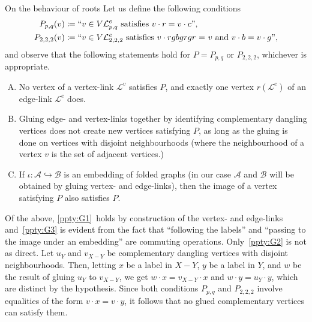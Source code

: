 \documentclass[10pt,a4paper]{amsart}
\theoremstyle{definition}
\newenvironment{enonce*}[1][]{\par\medskip\noindent}{\par\medskip}
\newcommand{\cA}{\mathcal{A}}
\newcommand{\cB}{\mathcal{B}}
\newcommand{\cL}{\mathcal{L}}
\begin{document}
\begin{enonce*}[remark]
{On the behaviour of roots} Let us define the following conditions
\begin{alignat*}{10}
P_{p,q}(v) &\coloneqq \text{$``v\in V\cL_{p,q}^e$ satisfies $v\cdot r = v\cdot c$''},\\
P_{2,2,2}(v) &\coloneqq \text{``$v\in V\cL_{2,2,2}^e$ satisfies $v\cdot rgbgrgr$ = $v$ and $v\cdot b = v\cdot g$''},
\end{alignat*}
and observe that the following statements hold for $P = P_{p,q}$ or $P_{2,2,2}$, whichever is appropriate.

\begin{enumerate}[G.\arabic{enumi}]
\item \label{ppty:G1} No vertex of a vertex-link $\cL^v$ satisfies $P$, and exactly one vertex $r(\cL^e)$ of an edge-link $\cL^e$ does.
\item \label{ppty:G2} Gluing edge- and vertex-links together by identifying complementary dangling vertices does not create new vertices satisfying $P$, as long as the gluing is done on vertices with disjoint neighbourhoods (where the neighbourhood of a vertex $v$ is the set of adjacent vertices.)
\item \label{ppty:G3} If $\iota:\cA \hookrightarrow \cB$ is an embedding of folded graphs (in our case $\cA$ and $\cB$ will be obtained by gluing vertex- and edge-links), then the image of a vertex satisfying $P$ also satisfies $P$. 
\end{enumerate}

Of the above, \ref{ppty:G1}~holds by construction of the vertex- and edge-links and~\ref{ppty:G3} is evident from the fact that ``following the labels'' and ``passing to the image under an embedding'' are commuting operations. Only~\ref{ppty:G2} is not as direct. Let $u_Y$ and $v_{X-Y}$ be complementary dangling vertices with disjoint neighbourhoods. Then, letting $x$ be a label in $X-Y$, $y$ be a label in $Y$, and $w$ be the result of gluing $u_Y$ to $v_{X-Y}$, we get $w\cdot x = v_{X-Y} \cdot x$ and $w\cdot y = u_Y\cdot y$, which are distinct by the hypothesis. Since both conditions $P_{p,q}$ and $P_{2,2,2}$ involve equalities of the form $v\cdot x = v\cdot y$, it follows that no glued complementary vertices can satisfy them.
\end{enonce*}
\end{document}
